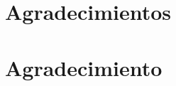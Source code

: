 \documentclass[conference,compsoc,a4paper]{IEEEtran}
\begin{document}
%





\ifCLASSOPTIONcompsoc
  \section*{Agradecimientos}
\else
  \section*{Agradecimiento}
\fi
\end{document}
